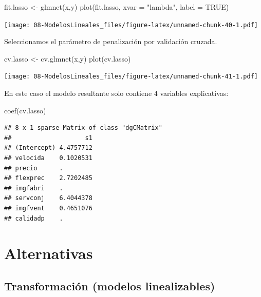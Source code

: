 \documentclass[
]{book}
\newenvironment{Shaded}{\begin{snugshade}}{\end{snugshade}}
\newcommand{\AttributeTok}[1]{\textcolor[rgb]{0.77,0.63,0.00}{#1}}
\newcommand{\ConstantTok}[1]{\textcolor[rgb]{0.00,0.00,0.00}{#1}}
\newcommand{\FunctionTok}[1]{\textcolor[rgb]{0.00,0.00,0.00}{#1}}
\newcommand{\NormalTok}[1]{#1}
\newcommand{\OtherTok}[1]{\textcolor[rgb]{0.56,0.35,0.01}{#1}}
\newcommand{\StringTok}[1]{\textcolor[rgb]{0.31,0.60,0.02}{#1}}
\theoremstyle{break}
\begin{document}
\begin{Shaded}
\begin{Highlighting}[]
\NormalTok{fit.lasso }\OtherTok{\textless{}{-}} \FunctionTok{glmnet}\NormalTok{(x,y)}
\FunctionTok{plot}\NormalTok{(fit.lasso, }\AttributeTok{xvar =} \StringTok{"lambda"}\NormalTok{, }\AttributeTok{label =} \ConstantTok{TRUE}\NormalTok{)}
\end{Highlighting}
\end{Shaded}

\texttt{[image: 08-ModelosLineales\_files/figure-latex/unnamed-chunk-40-1.pdf]}

Seleccionamos el parámetro de penalización por validación cruzada.

\begin{Shaded}
\begin{Highlighting}[]
\NormalTok{cv.lasso }\OtherTok{\textless{}{-}} \FunctionTok{cv.glmnet}\NormalTok{(x,y)}
\FunctionTok{plot}\NormalTok{(cv.lasso)}
\end{Highlighting}
\end{Shaded}

\texttt{[image: 08-ModelosLineales\_files/figure-latex/unnamed-chunk-41-1.pdf]}

En este caso el modelo resultante solo contiene 4 variables explicativas:

\begin{Shaded}
\begin{Highlighting}[]
\FunctionTok{coef}\NormalTok{(cv.lasso)}
\end{Highlighting}
\end{Shaded}

\begin{verbatim}
## 8 x 1 sparse Matrix of class "dgCMatrix"
##                    s1
## (Intercept) 4.4757712
## velocida    0.1020531
## precio      .        
## flexprec    2.7202485
## imgfabri    .        
## servconj    6.4044378
## imgfvent    0.4651076
## calidadp    .
\end{verbatim}

\hypertarget{alternativas}{%
\section{Alternativas}\label{alternativas}}

\hypertarget{transformaciuxf3n-modelos-linealizables}{%
\subsection{Transformación (modelos linealizables)}\label{transformaciuxf3n-modelos-linealizables}}
\end{document}
